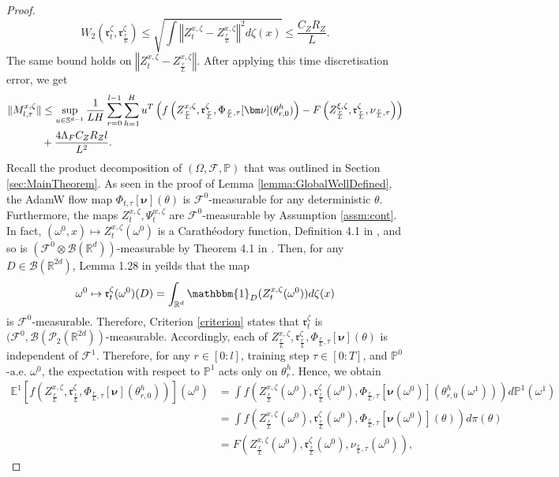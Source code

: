 \documentclass{article}
\newcommand{\R}{\mathbb{R}}
\begin{document}
\begin{appendices}
\begin{proof}
\[
W_2\left(\mathfrak{r}^\zeta_t,\mathfrak{r}^\zeta_\frac{r}{L}\right)\le\sqrt{\int \left\Vert Z^{x,\zeta}_t-Z_\frac{r}{L}^{x,\zeta}\right\Vert^2d\zeta(x)} \le \frac{C_Z R_Z}{L}.
\]
The same bound holds on $\left\Vert Z^{x,\zeta}_t-Z^{x,\zeta}_\frac{r}{L} \right\Vert $.
After applying this time discretisation error, we get
\begin{align}\label{eqn:ToDoRadSym}
       \Vert M^{x,\zeta}_{l,\tau}\Vert &\le \sup_{u\in \mathbb S^{d-1}}\frac{1}{LH} \sum_{r=0}^{l-1} \sum_{h=1}^H u^T\left(f\left(Z^{x,\zeta}_\frac{r}{L},\mathfrak{r}^\zeta_\frac{r}{L},\Phi_{\frac{r}{L},\tau}[\bm\nu](\theta_{r,0}^h)\right)-F\left(Z^{\xi,\zeta}_\frac{r}{L},\mathfrak{r}^\zeta_\frac{r}{L},\nu_{\frac{r}{L},\tau}\right)\right)\\
    &+\frac{4\Lambda_FC_Z R_Z l}{L^2}. \notag
\end{align} 
Recall the product decomposition of $(\Omega,\mathcal F,\mathbb P)$ that was outlined in Section \ref{sec:MainTheorem}. As seen in the proof of Lemma \ref{lemma:GlobalWellDefined}, the AdamW flow map $\Phi_{t,\tau}[\bm\nu](\theta)$ is $\mathcal{F}^0
$-measurable for any deterministic $\theta$. Furthermore, the maps $Z^{x,\zeta}_t,\Psi^{w,\zeta}_t$ are $\mathcal F^0$-measurable by Assumption \ref{assm:cont}. In fact, $(\omega^0,x)\mapsto Z^{x,\zeta}_t(\omega^0)$ is a Carath\'eodory function, Definition 4.1 in \cite{AZHMYAKOV201987}, and so is $(\mathcal F^0\otimes \mathcal B(\R^{d}))$-measurable by Theorem 4.1 in \cite{AZHMYAKOV201987}. Then, for any $D \in \mathcal B(\R^{2d})$, Lemma 1.28 in \cite{Kallenberg2021} yeilds that the map
\[
\omega^0\mapsto \mathfrak{r}^\zeta_{t}(\omega^0)(D) = \int_{\R^d} \mathbbm{1}_{D}(Z^{x,\zeta}_t(\omega^0)) d\zeta(x)
\]
is $\mathcal F^0$-measurable. Therefore, Criterion \ref{criterion} states that $\mathfrak{r}^\zeta_{t}$ is $(\mathcal F^0,\mathcal B(\mathcal P_2(\R^{2d}))$-measurable. Accordingly, each of $Z^{x,\zeta}_\frac{r}{L},\mathfrak{r}^\zeta_\frac{r}{L},\Phi_{\frac{r}{L},\tau}[\bm\nu](\theta)$ is independent of $\mathcal F^1$. Therefore, for any $r\in[0:l]$, training step $\tau \in[0:T]$, and $\mathbb P^0$-a.e. $\omega^0$, the expectation with respect to $\mathbb P^1$ acts only on $\theta^h_r$. Hence, we obtain
\begin{align*}
    \mathbb E^1 \left[f\left(Z^{x,\zeta}_\frac{r}{L},\mathfrak{r}^\zeta_\frac{r}{L},\Phi_{\frac{r}{L},\tau}[\bm\nu](\theta_{r,0}^h)\right)
\right](\omega^0)&=\int f\left(Z^{x,\zeta}_\frac{r}{L}(\omega^0),\mathfrak{r}^\zeta_\frac{r}{L}(\omega^0),\Phi_{\frac{r}{L},\tau}[\bm\nu(\omega^0)](\theta_{r,0}^h(\omega^1))\right) d\mathbb P^1(\omega^1)\\&= \int f\left(Z^{x,\zeta}_\frac{r}{L}(\omega^0),\mathfrak{r}^\zeta_\frac{r}{L}(\omega^0),\Phi_{\frac{r}{L},\tau}[\bm\nu(\omega^0)](\theta)\right)d\pi(\theta)\\&=F\left(Z^{x,\zeta}_\frac{r}{L}(\omega^0),\mathfrak{r}^\zeta_\frac{r}{L}(\omega^0),\nu_{\frac{r}{L},\tau}(\omega^0)\right), 

\end{align*}
\end{proof}
\end{appendices}
\end{document}
